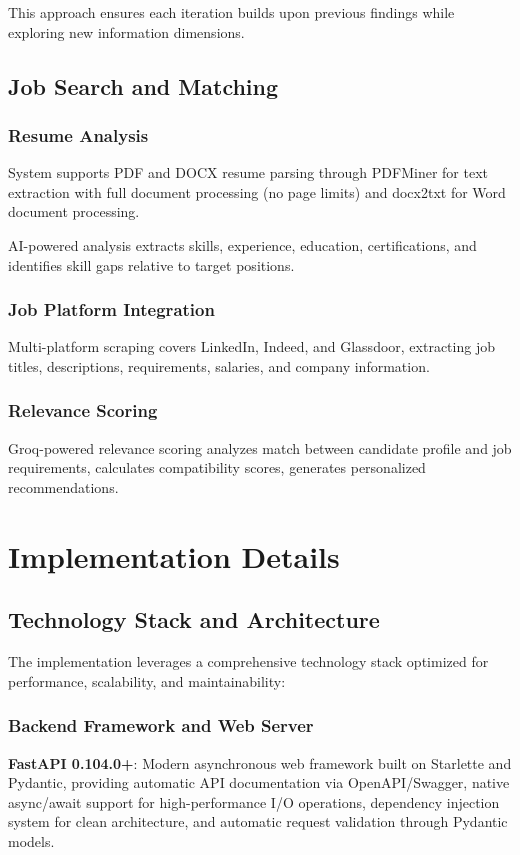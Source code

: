 \documentclass[conference]{IEEEtran}
\begin{document}
This approach ensures each iteration builds upon previous findings while exploring new information dimensions.

\subsection{Job Search and Matching}

\subsubsection{Resume Analysis}
System supports PDF and DOCX resume parsing through PDFMiner for text extraction with full document processing (no page limits) and docx2txt for Word document processing.

AI-powered analysis extracts skills, experience, education, certifications, and identifies skill gaps relative to target positions.

\subsubsection{Job Platform Integration}
Multi-platform scraping covers LinkedIn, Indeed, and Glassdoor, extracting job titles, descriptions, requirements, salaries, and company information.

\subsubsection{Relevance Scoring}
Groq-powered relevance scoring analyzes match between candidate profile and job requirements, calculates compatibility scores, generates personalized recommendations.

\section{Implementation Details}

\subsection{Technology Stack and Architecture}

The implementation leverages a comprehensive technology stack optimized for performance, scalability, and maintainability:

\subsubsection{Backend Framework and Web Server}
\textbf{FastAPI 0.104.0+}: Modern asynchronous web framework built on Starlette and Pydantic, providing automatic API documentation via OpenAPI/Swagger, native async/await support for high-performance I/O operations, dependency injection system for clean architecture, and automatic request validation through Pydantic models.
\end{document}
